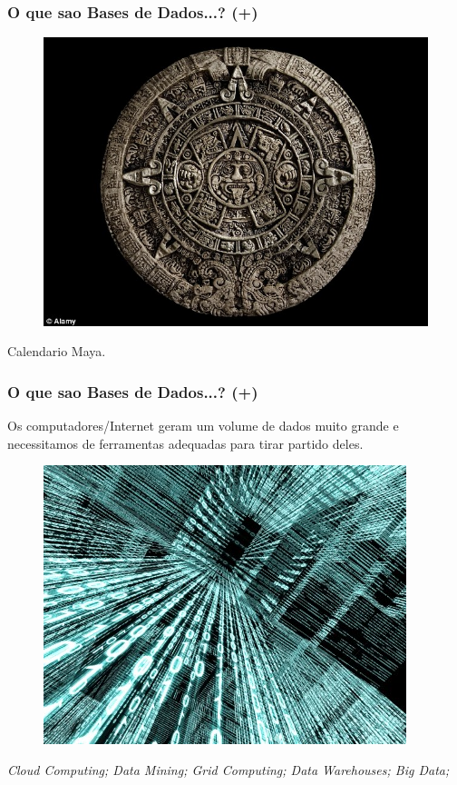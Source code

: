 \documentclass[hyperref={pdfpagelabels=true}]{beamer}
\begin{document}
\begin{frame}
\frametitle{O que sao Bases de Dados...? (+)}
\begin{overprint}
\begin{figure}
\includegraphics[scale=0.4]{mayas.jpg}
\end{figure}
Calendario Maya.\\
\end{overprint}
\end{frame}

\begin{frame}
\frametitle{O que sao Bases de Dados...? (+)}
\begin{overprint}
Os computadores/Internet geram um volume de dados muito grande e necessitamos de ferramentas adequadas para tirar partido deles.\\
\begin{figure}
\includegraphics[scale=0.4]{Big-Data-on-cloud.jpg}
\end{figure}
\end{overprint}
\textit{Cloud Computing; Data Mining; Grid Computing; Data Warehouses; Big Data;}
\end{frame}
\end{document}
